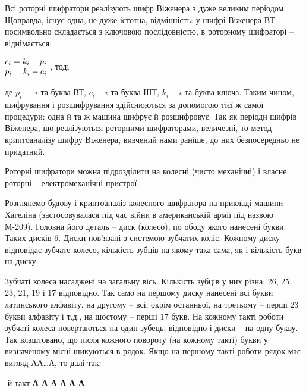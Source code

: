 \documentclass[a4paper]{article}
\newcounter{}
\begin{document}
Всі роторні шифратори реалізують шифр Віженера з дуже великим періодом.
Щоправда, існує одна, не дуже істотна, відмінність: у шифрі Віженера ВТ
посимвольно складається з ключовою послідовністю, в роторному шифраторі –
віднімається:


\bigskip

{\centering
 $\begin{matrix}{c_{{i}}=k_{{i}}-p_{{i}}}\hfill\null
\\p_{{i}}=k_{{i}}-c_{{i}}\hfill\null \end{matrix}\hfill $  , тоді
\par}


\bigskip

де  ${p_{{i}}-}$  ${i}${}-та буква ВТ,   ${c_{{i}}-i}${}-та буква ШТ, 
${k_{{i}}-i}${}-та буква ключа. Таким чином, шифрування і розшифрування
здійснюються за допомогою тієї ж самої процедури: одна й та ж машина шифрує й
розшифровує. Так як періоди шифрів Віженера, що реалізуються роторними
шифраторами, величезні, то метод криптоаналізу шифру Віженера, вивчений нами
раніше, до них безпосередньо не придатний.

Роторні шифратори можна підрозділити на колесні (чисто механічні) і власне
роторні – електромеханічні пристрої.

Розглянемо будову і криптоаналіз колесного шифратора на прикладі машини Хагеліна
(застосовувалася під час війни в американській армії під назвою М-209). Головна
його деталь – диск (колесо), по ободу якого нанесені букви. Таких дисків 6.
Диски пов’язані з системою зубчатих коліс. Кожному диску відповідає зубчате
колесо, кількість зубців на якому така сама, як і кількість букв на диску. 

Зубчаті колеса насаджені на загальну вісь. Кількість зубців у них різна: 26, 25,
23, 21, 19 і 17 відповідно. Так само на першому диску нанесені всі букви
латинського алфавіту, на другому – всі, окрім останньої, на третьому – перші 23
букви алфавіту і т.д., на шостому – перші 17 букв. На кожному такті роботи
зубчаті колеса повертаються на один зубець, відповідно і диски – на одну букву.
Так влаштовано, що після кожного повороту  (на кожному такті)  букви у
визначеному  місці  шикуються  в рядок. Якщо на першому  такті роботи рядок має
вигляд АА…А, то далі так:

\begin{figure}
\centering
\begin{minipage}{0.0161in}

\bigskip
\end{minipage}
\end{figure}
{-й такт  \textbf{А А А А А А}
\par}
\end{document}
